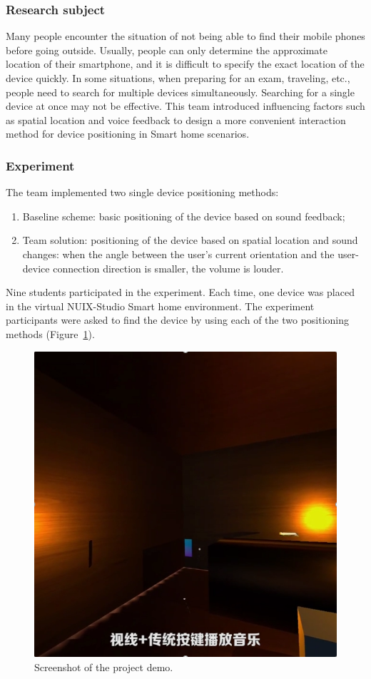 \subsubsection{Research subject}

Many people encounter the situation of not being able to find their mobile phones before going outside. Usually, people can only determine the approximate location of their smartphone, and it is difficult to specify the exact location of the device quickly. 
In some situations, when preparing for an exam, traveling, etc., people need to search for multiple devices simultaneously. Searching for a single device at once may not be effective.
This team introduced influencing factors such as spatial location and voice feedback to design a more convenient interaction method for device positioning in Smart home scenarios. 

\subsubsection{Experiment}
The team implemented two single device positioning methods:
\begin{enumerate}
    \item Baseline scheme: basic positioning of the device based on sound feedback;
    \item Team solution: positioning of the device based on spatial location and sound changes: when the angle between the user's current orientation and the user-device connection direction is smaller, the volume is louder.
\end{enumerate}

Nine students participated in the experiment. Each time, one device was placed in the virtual NUIX-Studio Smart home environment. The experiment participants were asked to find the device by using each of the two positioning methods (Figure~\ref{fig:Project1-1-figure}).

\begin{figure}
  \centering
  \includegraphics[width=0.6\linewidth]{figures/Project_1-1.png}
  \caption{Screenshot of the project demo.}
  \label{fig:Project1-1-figure}
\end{figure}

